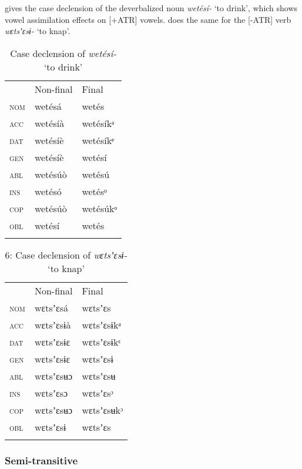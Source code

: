  gives the case declension of the deverbalized noun \textit{wetésí-} ‘to drink’, which shows vowel assimilation effects on [+ATR] vowels.  does the same for the [-ATR] verb \textit{wɛtsʼɛsɨ-} ‘to knap’.
 



\begin{table}
\caption{Case declension of \textit{wetésí-} ‘to drink’}
\label{tab:8.5}


\begin{tabularx}{\textwidth}{XXX}
& Non-final & Final\\
\lsptoprule
\textsc{nom} & wetésá & wetés\\
\textsc{acc} & wetésíà & wetésíkᵃ\\
\textsc{dat} & wetésíè & wetésíkᵉ\\
\textsc{gen} & wetésíè & wetésí\\
\textsc{abl} & wetésúò & wetésú\\
\textsc{ins} & wetésó & wetésᵒ\\
\textsc{cop} & wetésúò & wetésúkᵒ\\
\textsc{obl} & wetésí & wetés\\
\lspbottomrule
\end{tabularx}
\end{table}

\begin{table}
\caption{6: Case declension of \textit{wɛtsʼɛsɨ-} ‘to knap’}
\label{tab:8}


\begin{tabularx}{\textwidth}{XXX} & Non-final & Final\\
\lsptoprule
\textsc{nom} & wɛtsʼɛsá & wɛtsʼɛs\\
\textsc{acc} & wɛtsʼɛsɨà & wɛtsʼɛsɨkᵃ\\
\textsc{dat} & wɛtsʼɛsɨɛ & wɛtsʼɛsɨkᵋ\\
\textsc{gen} & wɛtsʼɛsɨɛ & wɛtsʼɛsɨ\\
\textsc{abl} & wɛtsʼɛsʉɔ & wɛtsʼɛsʉ\\
\textsc{ins} & wɛtsʼɛsɔ & wɛtsʼɛsᵓ\\
\textsc{cop} & wɛtsʼɛsʉɔ & wɛtsʼɛsʉkᵓ\\
\textsc{obl} & wɛtsʼɛsɨ & wɛtsʼɛs\\
\lspbottomrule
\end{tabularx}
\end{table}

\subsubsection{Semi-transitive}

